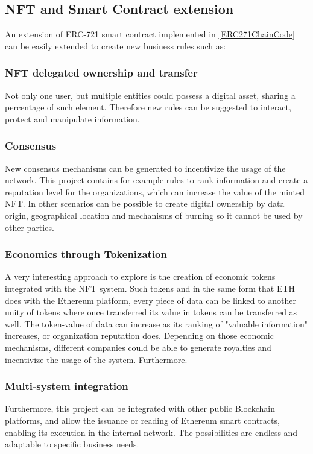 \subsection{NFT and Smart Contract extension}
An extension of \ac{ERC}-721 smart contract implemented in \ref{ERC271ChainCode} can be easily extended to create new business rules such as:

\subsubsection{\ac{NFT} delegated ownership and transfer}
Not only one user, but multiple entities could possess a digital asset, sharing a percentage of such element. Therefore new rules can be suggested to interact, protect and manipulate information.

\subsubsection{Consensus}
New consensus mechanisms can be generated to incentivize the usage of the network. This project contains for example rules to rank information and create a reputation level for the organizations, which can increase the value of the minted \ac{NFT}. In other scenarios can be possible to create digital ownership by data origin, geographical location and mechanisms of burning so it cannot be used by other parties.
 
\subsubsection{Economics through Tokenization}
A very interesting approach to explore is the creation of economic tokens integrated with the \ac{NFT} system. Such tokens and in the same form that \ac{ETH} does with the Ethereum platform, every piece of data can be linked to another unity of tokens where once transferred its value in tokens can be transferred as well. The token-value of data can increase as its ranking of "valuable information" increases, or organization reputation does.
Depending on those economic mechanisms, different companies could be able to generate royalties and incentivize the usage of the system. Furthermore.

\subsubsection{Multi-system integration}
Furthermore, this project can be integrated with other public Blockchain platforms, and allow the issuance or reading of  Ethereum smart contracts, enabling its execution in the internal network. The possibilities are endless and adaptable to specific business needs.